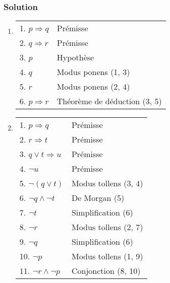     \subsubsection*{Solution}
    \begin{enumerate}

	\item  \hspace{1em}
    \begin{center}
    \begin{tabular}{|l|l|}
    \hline
    1. $p \Rightarrow q$ & Prémisse \\
    2. $q \Rightarrow r$ & Prémisse \\
    \hspace{0.5cm} 3. $p$ & Hypothèse \\
    \hspace{0.5cm} 4. $q$ & Modus ponens (1, 3) \\
    \hspace{0.5cm} 5. $r$ & Modus ponens (2, 4) \\
    6. $p \Rightarrow r$ & Théorème de déduction (3, 5) \\
    \hline
    \end{tabular}
    \end{center}

	\item  \hspace{1em}
    \begin{center}
    \begin{tabular}{|l|l|}
    \hline
    1. $p \Rightarrow q$ & Prémisse \\
    2. $r \Rightarrow t$ & Prémisse \\
    3. $q \lor t \Rightarrow u $ & Prémisse \\
    4. $\lnot u$ & Prémisse \\
    5. $\lnot (q \lor t)$ & Modus tollens (3, 4) \\
    6. $\lnot q \land \lnot t$ & De Morgan (5) \\
    7. $\lnot t$ & Simplification (6) \\
    8. $\lnot r$ & Modus tollens (2, 7) \\
    9. $\lnot q$ & Simplification (6) \\
    10. $\lnot p$ & Modus tollens (1, 9) \\
    11. $\lnot r \land \lnot p$ & Conjonction (8, 10) \\
    \hline
    \end{tabular}
    \end{center}


\end{enumerate}

